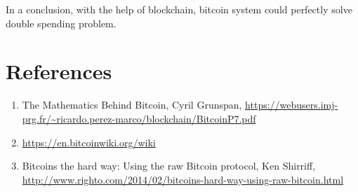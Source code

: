 \documentclass[12pt,a4paper]{article}
\begin{document}
 In a conclusion, with the help of blockchain, bitcoin system could perfectly solve double spending problem.

\section{References}
\begin{enumerate}
	\item The Mathematics Behind Bitcoin, Cyril Grunspan, \url{https://webusers.imj-prg.fr/~ricardo.perez-marco/blockchain/BitcoinP7.pdf}
	\item \url{https://en.bitcoinwiki.org/wiki}
	\item Bitcoins the hard way: Using the raw Bitcoin protocol, Ken Shirriff, \url{http://www.righto.com/2014/02/bitcoins-hard-way-using-raw-bitcoin.html}
\end{enumerate}
\end{document}
